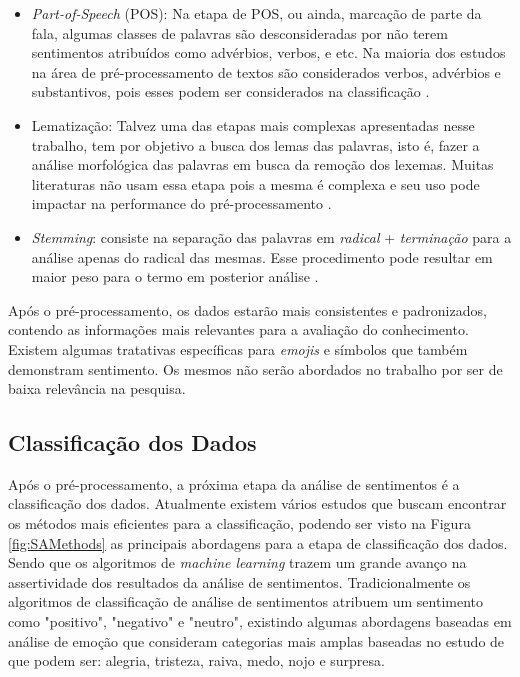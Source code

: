 \begin{itemize}
\item \textit{Part-of-Speech} (POS): Na etapa de POS, ou ainda, marcação de parte da fala, algumas classes de palavras são desconsideradas por não terem sentimentos atribuídos como advérbios, verbos, e etc. Na maioria dos estudos na área de pré-processamento de textos são considerados verbos, advérbios e substantivos, pois esses podem ser considerados na classificação \cite{Barbosa:2010:RSD:1944566.1944571}.

\item Lematização: Talvez uma das etapas mais complexas apresentadas nesse trabalho, tem por objetivo a busca dos lemas das palavras, isto é, fazer a análise morfológica das palavras em busca da remoção dos lexemas. Muitas literaturas não usam essa etapa pois a mesma é complexa e seu uso pode impactar na performance do pré-processamento \cite{Guzman2014}.

\item \textit{Stemming}: consiste na separação das palavras em \textit{radical} + \textit{terminação} para a análise apenas do radical das mesmas. Esse procedimento pode resultar em maior peso para o termo em posterior análise \cite{Porter1980}.
\end{itemize}

Após o pré-processamento, os dados estarão mais consistentes e padronizados, contendo as informações mais relevantes para a avaliação do conhecimento. Existem algumas tratativas específicas para \textit{emojis} e símbolos que também demonstram sentimento. Os mesmos não serão abordados no trabalho por ser de baixa relevância na pesquisa.

\subsection{Classificação dos Dados}
Após o pré-processamento, a próxima etapa da análise de sentimentos é a classificação dos dados. Atualmente existem vários estudos que buscam encontrar os métodos mais eficientes para a classificação, podendo ser visto na Figura \ref{fig:SAMethods} as principais abordagens para a etapa de classificação dos dados. Sendo que os algoritmos de \textit{machine learning} trazem um grande avanço na assertividade dos resultados da análise de sentimentos. Tradicionalmente os algoritmos de classificação de análise de sentimentos atribuem um sentimento como "positivo", "negativo" e "neutro", existindo algumas abordagens baseadas em análise de emoção que consideram categorias mais amplas baseadas no estudo de  que podem ser: alegria, tristeza, raiva, medo, nojo e surpresa.  

